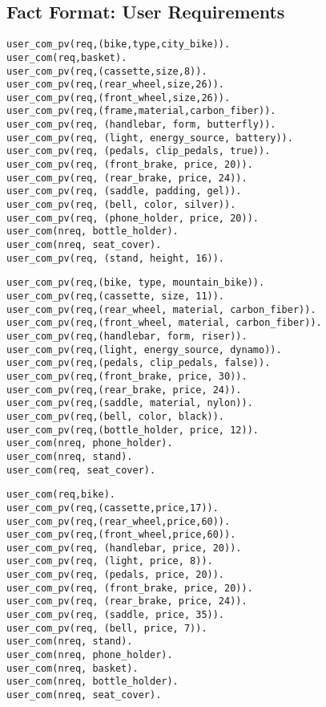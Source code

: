 \subsection{Fact Format: User Requirements}
\begin{lstlisting}[caption =  {Requirements User 1}, basicstyle=\ttfamily, label = {user1}]
user_com_pv(req,(bike,type,city_bike)).
user_com(req,basket).
user_com_pv(req,(cassette,size,8)).
user_com_pv(req,(rear_wheel,size,26)).
user_com_pv(req,(front_wheel,size,26)).
user_com_pv(req,(frame,material,carbon_fiber)).
user_com_pv(req, (handlebar, form, butterfly)).
user_com_pv(req, (light, energy_source, battery)).
user_com_pv(req, (pedals, clip_pedals, true)).
user_com_pv(req, (front_brake, price, 20)).
user_com_pv(req, (rear_brake, price, 24)).
user_com_pv(req, (saddle, padding, gel)).
user_com_pv(req, (bell, color, silver)).
user_com_pv(req, (phone_holder, price, 20)).
user_com(nreq, bottle_holder).
user_com(nreq, seat_cover).
user_com_pv(req, (stand, height, 16)).
\end{lstlisting}

\begin{lstlisting}[caption = {Requirements User 2}, basicstyle=\ttfamily, label = {user2}]
user_com_pv(req,(bike, type, mountain_bike)).
user_com_pv(req,(cassette, size, 11)).
user_com_pv(req,(rear_wheel, material, carbon_fiber)).
user_com_pv(req,(front_wheel, material, carbon_fiber)).
user_com_pv(req,(handlebar, form, riser)).
user_com_pv(req,(light, energy_source, dynamo)).
user_com_pv(req,(pedals, clip_pedals, false)).
user_com_pv(req,(front_brake, price, 30)).
user_com_pv(req,(rear_brake, price, 24)).
user_com_pv(req,(saddle, material, nylon)).
user_com_pv(req,(bell, color, black)).
user_com_pv(req,(bottle_holder, price, 12)).
user_com(nreq, phone_holder).
user_com(nreq, stand).
user_com(req, seat_cover).
\end{lstlisting}
\newpage
\begin{lstlisting}[caption = {Requirements User 3}, basicstyle=\ttfamily, label = {user3}]
user_com(req,bike).
user_com_pv(req,(cassette,price,17)).
user_com_pv(req,(rear_wheel,price,60)).
user_com_pv(req,(front_wheel,price,60)).
user_com_pv(req, (handlebar, price, 20)).
user_com_pv(req, (light, price, 8)).
user_com_pv(req, (pedals, price, 20)).
user_com_pv(req, (front_brake, price, 20)).
user_com_pv(req, (rear_brake, price, 24)).
user_com_pv(req, (saddle, price, 35)).
user_com_pv(req, (bell, price, 7)).
user_com(nreq, stand).
user_com(nreq, phone_holder).
user_com(nreq, basket).
user_com(nreq, bottle_holder).
user_com(nreq, seat_cover).
\end{lstlisting}

